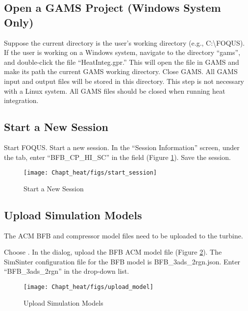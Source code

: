 \subsection{Open a GAMS Project (Windows System Only)}

Suppose the current directory is the user's working directory (e.g., C:\textbackslash FOQUS). If the user is working on a Windows system, navigate to the directory ``gams'', and double-click the file ``HeatInteg.gpr.'' This will open the file in GAMS and make its path the current GAMS working directory.  Close GAMS. All GAMS input and output files will be stored in this directory. This step is not necessary with a Linux system. All GAMS files should be closed when running heat integration.

\subsection{Start a New Session}

Start FOQUS. Start a new session. In the ``Session Information'' screen, under the  tab, enter ``BFB\_CP\_HI\_SC'' in the  field (Figure \ref{start.session}). Save the session.

\begin{figure}[H]
	\begin{center}
		\texttt{[image: Chapt\_heat/figs/start\_session]}
		\caption{Start a New Session}
		\label{start.session}
	\end{center}
\end{figure}

\subsection{Upload Simulation Models}	

The ACM BFB and compressor model files need to be uploaded to the turbine.

Choose . In the  dialog, upload the BFB ACM model file (Figure \ref{upload model}). The SimSinter configuration file for the BFB model is BFB\_3ads\_2rgn.json. Enter ``BFB\_3ads\_2rgn'' in the   drop-down list.

\begin{figure}[H]
	\begin{center}
		\texttt{[image: Chapt\_heat/figs/upload\_model]}
		\caption{Upload Simulation Models}
		\label{upload model}
	\end{center}
\end{figure}


